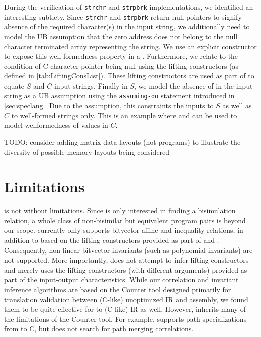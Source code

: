 During the verification of {\tt strchr} and {\tt strpbrk} implementations,
we identified an interesting subtlety. Since {\tt strchr} and {\tt strpbrk}
return null pointers to signify absence of the required character(s) in the input string,
we additionally need to model the UB assumption that the zero
address does not belong to the null character terminated array representing the string.
We use an explicit constructor  to expose this well-formedness property in a \SpecL{} .
Furthermore, we relate  to the condition of C character pointer being null using the
lifting constructors  (as defined in \cref{tab:LiftingConsList}).
These lifting constructors are used as part of \pre{} to equate $S$ and $C$ input strings.
Finally in $S$, we model the absence of  in the input string as a UB assumption using
the {\tt assuming-do} statement introduced in \cref{sec:speclang}.
Due to the \sdef{} assumption, this constraints the inputs to $S$ as well as $C$ to well-formed strings only.
This is an example where \sdef{} and \pre{} can be used to model wellformedness of values in $C$.

TODO: consider adding matrix data layouts (not programs) to illustrate the diversity of possible memory layouts being considered

\section{Limitations}
\label{sec:limitations}
\toolName{} is not without limitations.
Since \toolName{} is only interested in finding a bisimulation relation,
a whole class of non-bisimilar but equivalent program pairs is beyond our scope.
\toolName{} currently only supports bitvector affine and inequality relations, in addition to \recursiveRelations{}
based on the lifting constructors provided as part of \pre{} and \post{}.
Consequently, non-linear bitvector invariants (such as polynomial invariants) are not supported.
More importantly, \toolName{} does not attempt to infer lifting constructors and merely
uses the lifting constructors (with different arguments) provided as part of the input-output characteristics.
While our correlation and invariant inference algorithms are based on the Counter tool \cite{oopsla20}
designed primarily for translation validation between (C-like) unoptimized IR and assembly, we found them to be
quite effective for \SpecL{} to (C-like) IR as well.
However, \toolName{} inherits many of the limitations of the Counter tool.
For example, \toolName{} supports path specializations from \SpecL{} to C, but does not
search for path merging correlations.

